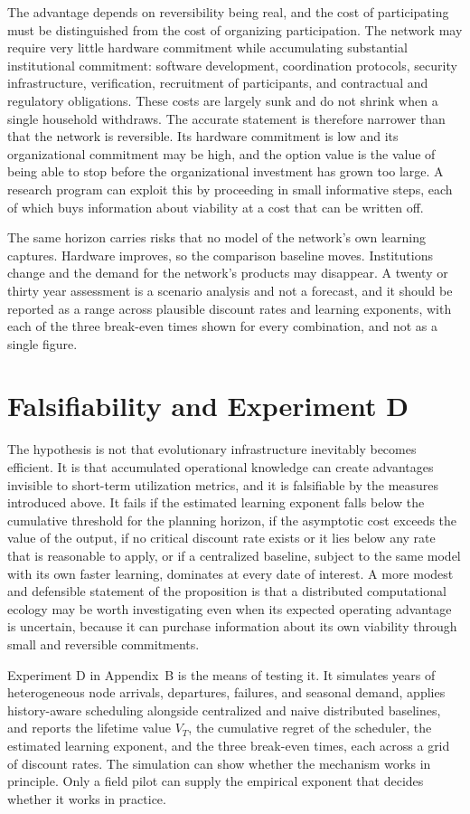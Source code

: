 The advantage depends on reversibility being real, and the cost of participating must be distinguished from the cost of organizing participation. The network may require very little hardware commitment while accumulating substantial institutional commitment: software development, coordination protocols, security infrastructure, verification, recruitment of participants, and contractual and regulatory obligations. These costs are largely sunk and do not shrink when a single household withdraws. The accurate statement is therefore narrower than that the network is reversible. Its hardware commitment is low and its organizational commitment may be high, and the option value is the value of being able to stop before the organizational investment has grown too large. A research program can exploit this by proceeding in small informative steps, each of which buys information about viability at a cost that can be written off.

The same horizon carries risks that no model of the network's own learning captures. Hardware improves, so the comparison baseline moves. Institutions change and the demand for the network's products may disappear. A twenty or thirty year assessment is a scenario analysis and not a forecast, and it should be reported as a range across plausible discount rates and learning exponents, with each of the three break-even times shown for every combination, and not as a single figure.

\section{Falsifiability and Experiment D}

The hypothesis is not that evolutionary infrastructure inevitably becomes efficient. It is that accumulated operational knowledge can create advantages invisible to short-term utilization metrics, and it is falsifiable by the measures introduced above. It fails if the estimated learning exponent falls below the cumulative threshold for the planning horizon, if the asymptotic cost exceeds the value of the output, if no critical discount rate exists or it lies below any rate that is reasonable to apply, or if a centralized baseline, subject to the same model with its own faster learning, dominates at every date of interest. A more modest and defensible statement of the proposition is that a distributed computational ecology may be worth investigating even when its expected operating advantage is uncertain, because it can purchase information about its own viability through small and reversible commitments.

Experiment D in Appendix~B is the means of testing it. It simulates years of heterogeneous node arrivals, departures, failures, and seasonal demand, applies history-aware scheduling alongside centralized and naive distributed baselines, and reports the lifetime value $V_T$, the cumulative regret of the scheduler, the estimated learning exponent, and the three break-even times, each across a grid of discount rates. The simulation can show whether the mechanism works in principle. Only a field pilot can supply the empirical exponent that decides whether it works in practice.
